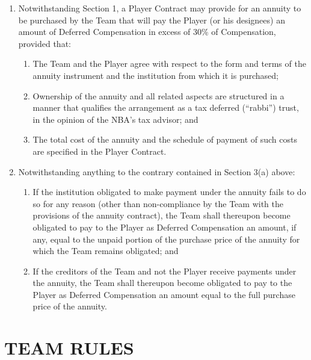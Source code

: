 \documentclass[
]{book}
\providecommand{\tightlist}{%
  \setlength{\itemsep}{0pt}\setlength{\parskip}{0pt}}
\begin{document}
\begin{enumerate}
\def\labelenumi{(\alph{enumi})}
\tightlist
\item
  Notwithstanding Section 1, a Player Contract may provide for an annuity to be purchased by the Team that will pay the Player (or his designees) an amount of Deferred Compensation in excess of 30\% of Compensation, provided that:

  \begin{enumerate}
  \def\labelenumii{(\roman{enumii})}
  \tightlist
  \item
    The Team and the Player agree with respect to the form and terms of the annuity instrument and the institution from which it is purchased;
  \item
    Ownership of the annuity and all related aspects are structured in a manner that qualifies the arrangement as a tax deferred (``rabbi'') trust, in the opinion of the NBA's tax advisor; and
  \item
    The total cost of the annuity and the schedule of payment of such costs are specified in the Player Contract.
  \end{enumerate}
\item
  Notwithstanding anything to the contrary contained in Section 3(a) above:

  \begin{enumerate}
  \def\labelenumii{(\roman{enumii})}
  \tightlist
  \item
    If the institution obligated to make payment under the annuity fails to do so for any reason (other than non-compliance by the Team with the provisions of the annuity contract), the Team shall thereupon become obligated to pay to the Player as Deferred Compensation an amount, if any, equal to the unpaid portion of the purchase price of the annuity for which the Team remains obligated; and
  \item
    If the creditors of the Team and not the Player receive payments under the annuity, the Team shall thereupon become obligated to pay to the Player as Deferred Compensation an amount equal to the full purchase price of the annuity.
  \end{enumerate}
\end{enumerate}

\hypertarget{team-rules}{%
\chapter{TEAM RULES}\label{team-rules}}
\end{document}
